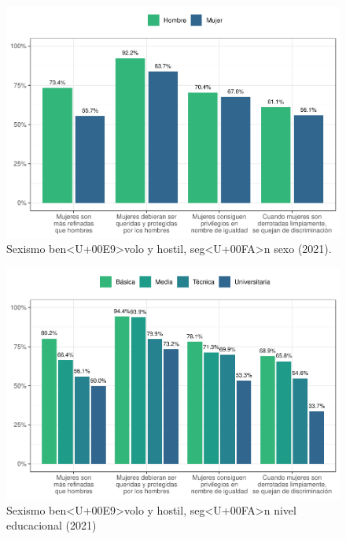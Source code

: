 \documentclass[
  12pt,
]{book}
\begin{document}
\begin{figure}

{\centering \includegraphics{reporte-elsoc_files/figure-latex/sexismo-sexo-1} 

}

\caption{Sexismo ben<U+00E9>volo y hostil, seg<U+00FA>n sexo (2021).}\label{fig:sexismo-sexo}
\end{figure}

\begin{figure}

{\centering \includegraphics{reporte-elsoc_files/figure-latex/sexismo-educ-1} 

}

\caption{Sexismo ben<U+00E9>volo y hostil, seg<U+00FA>n nivel educacional (2021)}\label{fig:sexismo-educ}
\end{figure}
\end{document}
